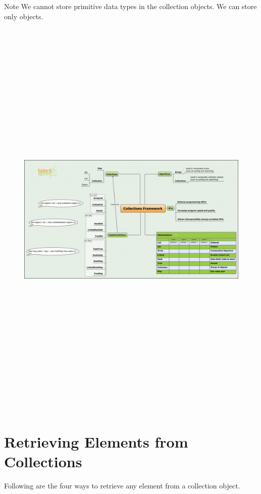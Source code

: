 \documentclass[11pt,a4paper]{article}
\begin{document}
\begin{bclogo}[couleur=blue!5, arrondi=0.3, logo=\bclampe ]{Note}
We cannot store primitive data types in the collection objects. We can store only objects.
\end{bclogo}
\begin{figure}[H]
 \begin{center}
   \includegraphics[angle=90,height=20cm, width=13cm]{CollectionsFramework.png}
 \end{center}
 \end{figure}
\section*{Retrieving Elements from Collections}
Following are the four ways to retrieve any element from a collection object.
\end{document}
